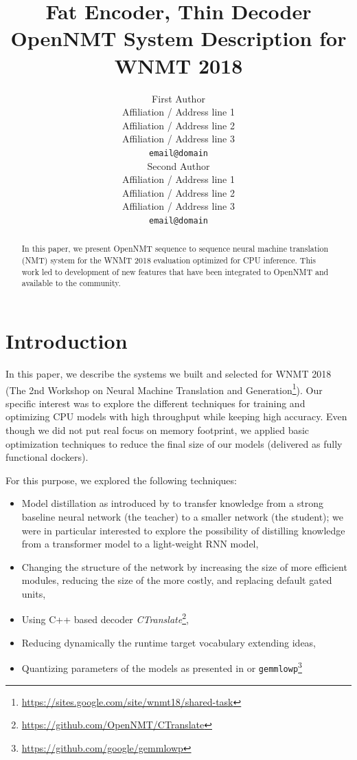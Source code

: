 \documentclass[11pt,a4paper]{article}
\title{Fat Encoder, Thin Decoder \protect\\ OpenNMT System Description for WNMT 2018}
\author{First Author \\
  Affiliation / Address line 1 \\
  Affiliation / Address line 2 \\
  Affiliation / Address line 3 \\
  {\tt email@domain} \\\And
  Second Author \\
  Affiliation / Address line 1 \\
  Affiliation / Address line 2 \\
  Affiliation / Address line 3 \\
  {\tt email@domain} \\}
\date{}
\begin{document}
\maketitle
\begin{abstract}
In this paper, we present OpenNMT sequence to sequence neural machine translation (NMT) system for the WNMT 2018 evaluation optimized for CPU inference. This work led to development of new features that have been integrated to OpenNMT and available to the community.

\end{abstract}

\section{Introduction}
In this paper, we describe the systems we built and selected for WNMT 2018 (The 2nd Workshop on Neural Machine Translation and Generation\footnote{\url{https://sites.google.com/site/wnmt18/shared-task}}). Our specific interest was to explore the different techniques for training and optimizing CPU models with high throughput while keeping high accuracy. Even though we did not put real focus on memory footprint, we applied basic optimization techniques to reduce the final size of our models (delivered as fully functional dockers).

For this purpose, we explored the following techniques:
\begin{itemize}
\item Model distillation as introduced by  to transfer knowledge from a strong baseline neural network (the teacher) to a smaller network (the student); we were in particular interested to explore the possibility of distilling knowledge from a transformer model \cite{vaswani2017attention} to a light-weight RNN model,
\item Changing the structure of the network by increasing the size of more efficient modules, reducing the size of the more costly, and replacing default gated units,
\item Using C++ based decoder \textit{CTranslate}\footnote{\url{https://github.com/OpenNMT/CTranslate}},
\item Reducing dynamically the runtime target vocabulary extending \cite{shi2017speeding} ideas,
\item Quantizing parameters of the models as presented in  or {\tt gemmlowp}\footnote{\url{https://github.com/google/gemmlowp}}
\end{itemize}
\end{document}
